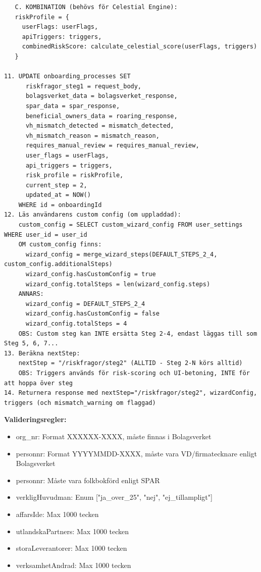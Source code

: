 \documentclass[12pt,a4paper]{article}
\begin{document}
\begin{lstlisting}
   C. KOMBINATION (behövs för Celestial Engine):
   riskProfile = {
     userFlags: userFlags,
     apiTriggers: triggers,
     combinedRiskScore: calculate_celestial_score(userFlags, triggers)
   }

11. UPDATE onboarding_processes SET 
      riskfragor_steg1 = request_body,
      bolagsverket_data = bolagsverket_response,
      spar_data = spar_response,
      beneficial_owners_data = roaring_response,
      vh_mismatch_detected = mismatch_detected,
      vh_mismatch_reason = mismatch_reason,
      requires_manual_review = requires_manual_review,
      user_flags = userFlags,
      api_triggers = triggers,
      risk_profile = riskProfile,
      current_step = 2,
      updated_at = NOW()
    WHERE id = onboardingId
12. Läs användarens custom config (om uppladdad):
    custom_config = SELECT custom_wizard_config FROM user_settings WHERE user_id = user_id
    OM custom_config finns:
      wizard_config = merge_wizard_steps(DEFAULT_STEPS_2_4, custom_config.additionalSteps)
      wizard_config.hasCustomConfig = true
      wizard_config.totalSteps = len(wizard_config.steps)
    ANNARS:
      wizard_config = DEFAULT_STEPS_2_4
      wizard_config.hasCustomConfig = false
      wizard_config.totalSteps = 4
    OBS: Custom steg kan INTE ersätta Steg 2-4, endast läggas till som Steg 5, 6, 7...
13. Beräkna nextStep:
    nextStep = "/riskfragor/steg2" (ALLTID - Steg 2-N körs alltid)
    OBS: Triggers används för risk-scoring och UI-betoning, INTE för att hoppa över steg
14. Returnera response med nextStep="/riskfragor/steg2", wizardConfig, triggers (och mismatch_warning om flaggad)
\end{lstlisting}

\textbf{Valideringsregler:}
\begin{itemize}[noitemsep]
  \item org\_nr: Format XXXXXX-XXXX, måste finnas i Bolagsverket
  \item personnr: Format YYYYMMDD-XXXX, måste vara VD/firmatecknare enligt Bolagsverket
  \item personnr: Måste vara folkbokförd enligt SPAR
  \item verkligHuvudman: Enum ["ja\_over\_25", "nej", "ej\_tillampligt"]
  \item affarsIde: Max 1000 tecken
  \item utlandskaPartners: Max 1000 tecken
  \item storaLeverantorer: Max 1000 tecken
  \item verksamhetAndrad: Max 1000 tecken
\end{itemize}
\end{document}
